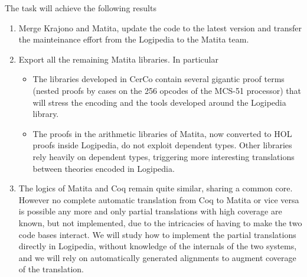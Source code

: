 The task will achieve the following results
\begin{enumerate}
\item Merge Krajono and Matita, update the code to the latest version and transfer the mainteinance effort from the Logipedia to the Matita team.
\item Export all the remaining Matita libraries. In particular
\begin{itemize}
 \item The libraries developed in CerCo contain several gigantic proof terms (nested proofs by cases on the 256 opcodes of the MCS-51 processor) that will stress the encoding and the tools developed around the Logipedia library.
 \item The proofs in the arithmetic libraries of Matita, now converted to HOL proofs inside Logipedia, do not exploit dependent types. Other libraries rely heavily on dependent types, triggering more interesting translations between theories encoded in Logipedia.
\end{itemize}
\item The logics of Matita and Coq remain quite similar, sharing a common core. However no complete automatic translation from Coq to Matita or vice versa is possible any more and only partial translations with high coverage are known, but not implemented, due to the intricacies of having to make the two code bases interact. We will study how to implement the partial translations directly in Logipedia, without knowledge of the internals of the two systems, and we will rely on automatically generated alignments to augment coverage of the translation.
\end{enumerate}

